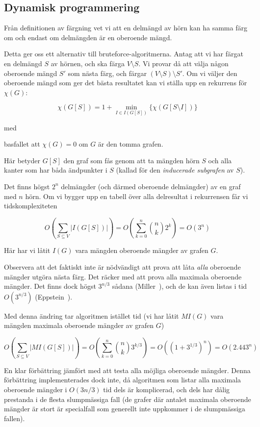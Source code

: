 \documentclass[a4paper]{report}
\begin{document}
\subsection{Dynamisk programmering}

Från definitionen av färgning vet vi att en delmängd av hörn kan ha samma färg om och endast om delmängden är en oberoende mängd.

Detta ger oss ett alternativ till bruteforce-algoritmerna. Antag att vi har färgat en delmängd $S$ av hörnen, och ska färga $V \setminus S$. Vi provar då att välja någon oberoende mängd $S'$ som nästa färg, och färgar $(V \setminus S) \setminus S'$. Om vi väljer den oberoende mängd som ger det bästa resultatet kan vi ställa upp en rekurrens för $\chi(G)$:

$$\chi(G[S]) = 1 + \min_{I \in I(G[S])}\{\chi(G[S \setminus I])\}$$

med

basfallet att $\chi(G) = 0$ om $G$ är den tomma grafen.

Här betyder $G[S]$ den graf som fås genom att ta mängden hörn $S$ och alla kanter som har båda ändpunkter i $S$ (kallad för den \emph{inducerade subgrafen} av $S$).

Det finns högst $2^n$ delmängder (och därmed oberoende delmängder) av en graf med $n$ hörn. Om vi bygger upp en tabell över alla delresultat
i rekurrensen får vi tidskomplexiteten

$$O(\sum_{S \subseteq V}{|I(G[S])|}) = O(\sum^n_{k=0}{{n \choose k}2^k}) = O(3^n)$$

Här har vi låtit $I(G)$ vara mängden oberoende mängder av grafen $G$.

Observera att det faktiskt inte är nödvändigt att prova att låta \emph{alla} oberoende mängder utgöra nästa färg. Det räcker med att prova alla maximala oberoende mängder. Det finns dock högst $3^{n/3}$ sådana (Miller~\cite{Miller:1960}), och de kan även listas i tid $O(3^{n/3})$ (Eppstein~\cite{Eppstein:2003}).

Med denna ändring tar algoritmen istället tid (vi har låtit $MI(G)$ vara mängden maximala oberoende mängder av grafen $G$)

$$O(\sum_{S \subseteq V}{|MI(G[S])|}) = O(\sum^n_{k=0}{{n \choose k}3^{k/3}}) = O((1 + 3^{1/3})^n) =  O(2.443^n)$$

En klar förbättring jämfört med att testa alla möjliga oberoende mängder. Denna förbättring implementerades dock inte, då algoritmen som listar alla maximala
oberoende mängder i $O(3{n/3})$ tid dels är komplicerad, och dels har dålig prestanda i de flesta slumpmässiga fall (de grafer där antalet maximala oberoende mängder
är stort är specialfall som generellt inte uppkommer i de slumpmässiga fallen).
\end{document}
